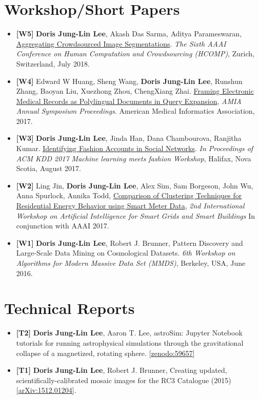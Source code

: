 \documentclass{res}
\begin{document}
\begin{resume}
\section{Workshop/Short Papers}
\begin{itemize}[leftmargin=0in,label={}]
\item \textbf{[W5]} \textbf{Doris Jung-Lin Lee}, Akash Das Sarma, Aditya Parameswaran, \href{http://ceur-ws.org/Vol-2173/paper10.pdf}{Aggregating Crowdsourced Image Segmentations}. \textit{The Sixth AAAI Conference on Human Computation and Crowdsourcing (HCOMP)}, Zurich, Switzerland, July 2018.
\item \textbf{[W4]} Edward W Huang, Sheng Wang, \textbf{Doris Jung-Lin Lee}, Runshun Zhang, Baoyan Liu, Xuezhong Zhou, ChengXiang Zhai. \href{https://amia2017.zerista.com/event/member/389402}{Framing Electronic Medical Records as Polylingual Documents in Query Expansion}, \textit{AMIA Annual Symposium Proceedings}. American Medical Informatics Association, 2017.
\item \textbf{[W3]} \textbf{Doris Jung-Lin Lee}, Jinda Han, Dana Chambourova, Ranjitha Kumar. \href{https://kddfashion2017.mybluemix.net/final_submissions/ML4Fashion_paper_21.pdf}{Identifying Fashion Accounts in Social Networks}.  \textit{In Proceedings of ACM KDD 2017 Machine learning meets fashion Workshop}, Halifax, Nova Scotia, August 2017.
\item \textbf{[W2]} Ling Jin, \textbf{Doris Jung-Lin Lee}, Alex Sim, Sam Borgeson, John Wu, Anna Spurlock, Annika Todd, \href{https://aaai.org/ocs/index.php/WS/AAAIW17/paper/view/15166/14673}{Comparison of Clustering Techniques for Residential Energy Behavior using Smart Meter Data}, \textit{2nd International Workshop on Artificial Intelligence for Smart Grids and Smart Buildings} In conjunction with AAAI 2017.
\item \textbf{[W1]} \textbf{Doris Jung-Lin Lee}, Robert J. Brunner, Pattern Discovery and Large-Scale Data Mining on Cosmological Datasets. \textit{6th Workshop on Algorithms for Modern Massive Data Set (MMDS)}, Berkeley, USA, June 2016.
\end{itemize}
\vspace{-10pt}
\section{Technical Reports}
\begin{itemize}[leftmargin=0in,label={}]
\item \textbf{[T2]} \textbf{Doris Jung-Lin Lee}, Aaron T. Lee, astroSim: Jupyter Notebook tutorials for running astrophysical simulations through the gravitational collapse of a magnetized, rotating sphere. [\href{http://doi.org/10.5281/zenodo.59657}{zenodo:59657}]
\item \textbf{[T1]}  \textbf{Doris Jung-Lin Lee}, Robert J. Brunner, Creating updated, scientifically-calibrated mosaic images for the RC3 Catalogue (2015) [\href{http://arxiv.org/abs/1512.01204}{arXiv:1512.01204}]. 
\end{itemize}
\vspace{-10pt}

\end{resume}
\end{document}
